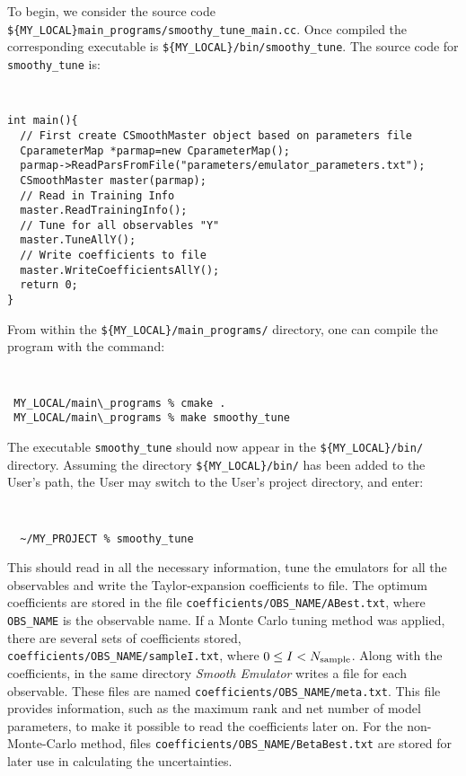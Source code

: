 \documentclass[UserManual.tex]{subfiles}
\begin{document}
To begin, we consider the source code {\tt \$\{MY\_LOCAL\}main\_programs/smoothy\_tune\_main.cc}. Once compiled the corresponding executable is {\tt \$\{MY\_LOCAL\}/bin/smoothy\_tune}. The source code for {\tt smoothy\_tune} is:
{\tt
\begin{verbatim}
int main(){
  // First create CSmoothMaster object based on parameters file
  CparameterMap *parmap=new CparameterMap();
  parmap->ReadParsFromFile("parameters/emulator_parameters.txt");
  CSmoothMaster master(parmap); 
  // Read in Training Info
  master.ReadTrainingInfo(); 
  // Tune for all observables "Y"
  master.TuneAllY();
  // Write coefficients to file
  master.WriteCoefficientsAllY();
  return 0;
}
\end{verbatim}
}
From within the {\tt \$\{MY\_LOCAL\}/main\_programs/} directory, one can compile the program with the command:
{\tt
\begin{verbatim}
 MY_LOCAL/main\_programs % cmake .
 MY_LOCAL/main\_programs % make smoothy_tune
\end{verbatim}
}
The executable {\tt smoothy\_tune} should now appear in the {\tt \$\{MY\_LOCAL\}/bin/} directory. Assuming the directory {\tt \$\{MY\_LOCAL\}/bin/} has been added to the User's path, the User may switch to the User's project directory, and enter:
{\tt
\begin{verbatim}
  ~/MY_PROJECT % smoothy_tune
\end{verbatim}
}
This should read in all the necessary information, tune the emulators for all the observables and write the Taylor-expansion coefficients to file.  The optimum coefficients are stored in the file {\tt coefficients/OBS\_NAME/ABest.txt}, where {\tt OBS\_NAME} is the observable name. If a Monte Carlo tuning method was applied, there are several sets of coefficients stored,\\{\tt coefficients/OBS\_NAME/sampleI.txt}, where $0\le I<N_{\rm sample}$. Along with the coefficients, in the same directory {\it Smooth Emulator} writes a file for each observable. These files are named {\tt coefficients/OBS\_NAME/meta.txt}.  This file provides information, such as the maximum rank and net number of model parameters, to make it possible to read the coefficients later on. For the non-Monte-Carlo method,  files {\tt coefficients/OBS\_NAME/BetaBest.txt} are stored for later use in calculating the uncertainties.
\end{document}
